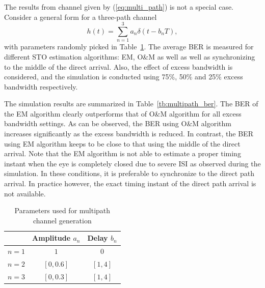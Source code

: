 \documentclass[12pt, draftclsnofoot, onecolumn]{IEEEtran}
\begin{document}
The results from channel given by (\ref{eq:multi_path}) is not a special case.
Consider a general form for a three-path channel
\begin{equation}
h(t)=\sum\limits_{n = 1}^{3}{a_n\delta(t - b_n T)},
\label{eq:multi_path_2}
\end{equation}
with parameters randomly picked in Table~\ref{tb:multipath_para}.
The average BER is measured for different STO estimation algorithms: EM, O\&M as well as well as synchronizing to the middle of the direct arrival.
Also, the effect of excess bandwidth is considered, and the simulation is conducted using 75\%, 50\% and 25\% excess bandwidth respectively. 

The simulation results are summarized in Table~\ref{tb:multipath_ber}. The BER of the EM algorithm clearly outperforms that of O\&M algorithm for all excess bandwidth settings.
As can be observed, the BER using O\&M algorithm increases significantly as the excess bandwidth is reduced. 
In contrast, the BER using EM algorithm keeps to be close to that using the middle of the direct arrival.
Note that the EM algorithm is not able to estimate a proper timing instant when the eye is completely closed due to severe ISI as observed during the simulation.
In these conditions, it is preferable to synchronize to the direct path arrival. 
In practice however, the exact timing instant of the direct path arrival is not available. 

\begin{table}[htbp]
\centering
\caption{Parameters used for multipath channel generation}
\label{tb:multipath_para}
\begin{tabular}{|l|c|c|}
\hline
      & Amplitude $a_n$ & Delay $b_n$ \\ \hline
$n=1$ & \(1\)      & \(0\)            \\ \hline
$n=2$ & $[0, 0.6]$ & $[1, 4]$         \\ \hline
$n=3$ & $[0, 0.3]$ & $[1, 4]$         \\ \hline
\end{tabular}
\end{table}
\end{document}

